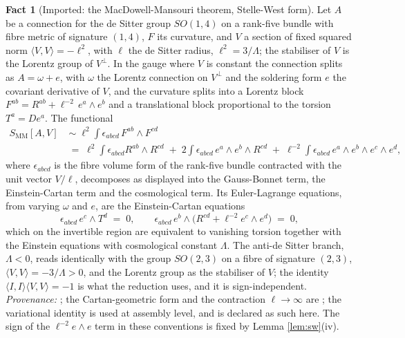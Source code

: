 \documentclass[11pt]{article}
\theoremstyle{definition}
\newtheorem{fact}[theorem]{Fact}
\newcommand{\ip}[2]{\langle #1, #2\rangle}
\begin{document}
\begin{fact}[Imported: the MacDowell-Mansouri theorem, Stelle-West form]\label{fact:mm}
Let $A$ be a connection for the de Sitter group $SO(1,4)$ on a rank-five bundle with fibre metric of signature $(1,4)$, $F$ its curvature, and $V$ a section of fixed squared norm $\ip{V}{V} = -\ell^2$, with $\ell$ the de Sitter radius, $\ell^2 = 3/\Lambda$; the stabiliser of $V$ is the Lorentz group of $V^\perp$. In the gauge where $V$ is constant the connection splits as $A = \omega + e$, with $\omega$ the Lorentz connection on $V^\perp$ and the soldering form $e$ the covariant derivative of $V$, and the curvature splits into a Lorentz block $F^{ab} = R^{ab} + \ell^{-2}\,e^a\wedge e^b$ and a translational block proportional to the torsion $T^a = D e^a$. The functional
\[
\begin{aligned}
S_{\mathrm{MM}}[A, V] \;&\sim\; \ell^{2}\int \epsilon_{abcd}\,F^{ab}\wedge F^{cd}\\
&=\; \ell^{2}\!\int \epsilon_{abcd}R^{ab}\wedge R^{cd} \;+\; 2\!\int \epsilon_{abcd}\, e^a\wedge e^b\wedge R^{cd} \;+\; \ell^{-2}\!\int \epsilon_{abcd}\, e^a\wedge e^b\wedge e^c\wedge e^d ,
\end{aligned}
\]
where $\epsilon_{abcd}$ is the fibre volume form of the rank-five bundle contracted with the unit vector $V/\ell$, decomposes as displayed into the Gauss-Bonnet term, the Einstein-Cartan term and the cosmological term. Its Euler-Lagrange equations, from varying $\omega$ and $e$, are the Einstein-Cartan equations
\begin{equation}\label{eq:ec}
\epsilon_{abcd}\, e^{c}\wedge T^{d} \;=\; 0, \qquad \epsilon_{abcd}\, e^{b}\wedge\bigl(R^{cd} + \ell^{-2} e^{c}\wedge e^{d}\bigr) \;=\; 0 ,
\end{equation}
which on the invertible region are equivalent to vanishing torsion together with the Einstein equations with cosmological constant $\Lambda$. The anti-de Sitter branch, $\Lambda < 0$, reads identically with the group $SO(2,3)$ on a fibre of signature $(2,3)$, $\ip{V}{V} = -3/\Lambda > 0$, and the Lorentz group as the stabiliser of $V$; the identity $\ip{I}{I}\ip{V}{V} = -1$ is what the reduction uses, and it is sign-independent. \emph{Provenance:} \cite{MacDowellMansouri1977, StelleWest1980}; the Cartan-geometric form and the contraction $\ell \to \infty$ are \cite{Wise2010}; the variational identity is used at assembly level, and is declared as such here. The sign of the $\ell^{-2}e\wedge e$ term in these conventions is fixed by Lemma \ref{lem:sw}(iv).
\end{fact}
\end{document}
